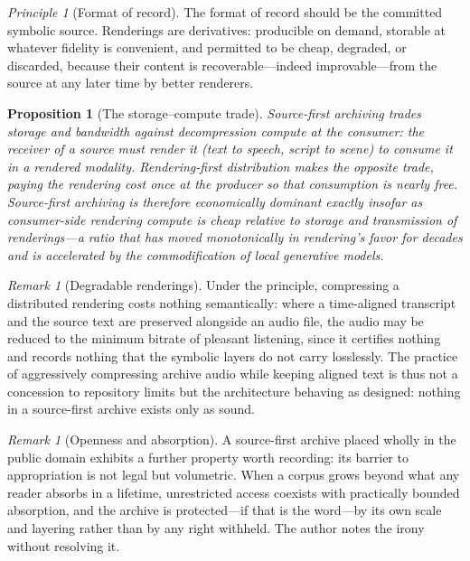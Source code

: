 \documentclass[11pt,oneside]{book}
\theoremstyle{plain}
\newtheorem{proposition}[theorem]{Proposition}
\theoremstyle{definition}
\theoremstyle{remark}
\newtheorem{remark}[theorem]{Remark}
\newtheorem{principle}[theorem]{Principle}
\begin{document}
\begin{principle}[Format of record]
The format of record should be the committed symbolic source. Renderings are derivatives: producible on demand, storable at whatever fidelity is convenient, and permitted to be cheap, degraded, or discarded, because their content is recoverable---indeed improvable---from the source at any later time by better renderers.
\end{principle}

\begin{proposition}[The storage--compute trade]
Source-first archiving trades storage and bandwidth against decompression compute at the consumer: the receiver of a source must render it (text to speech, script to scene) to consume it in a rendered modality. Rendering-first distribution makes the opposite trade, paying the rendering cost once at the producer so that consumption is nearly free. Source-first archiving is therefore economically dominant exactly insofar as consumer-side rendering compute is cheap relative to storage and transmission of renderings---a ratio that has moved monotonically in rendering's favor for decades and is accelerated by the commodification of local generative models.
\end{proposition}

\begin{remark}[Degradable renderings]
Under the principle, compressing a distributed rendering costs nothing semantically: where a time-aligned transcript and the source text are preserved alongside an audio file, the audio may be reduced to the minimum bitrate of pleasant listening, since it certifies nothing and records nothing that the symbolic layers do not carry losslessly. The practice of aggressively compressing archive audio while keeping aligned text is thus not a concession to repository limits but the architecture behaving as designed: nothing in a source-first archive exists only as sound.
\end{remark}

\begin{remark}[Openness and absorption]
A source-first archive placed wholly in the public domain exhibits a further property worth recording: its barrier to appropriation is not legal but volumetric. When a corpus grows beyond what any reader absorbs in a lifetime, unrestricted access coexists with practically bounded absorption, and the archive is protected---if that is the word---by its own scale and layering rather than by any right withheld. The author notes the irony without resolving it.
\end{remark}
\end{document}
